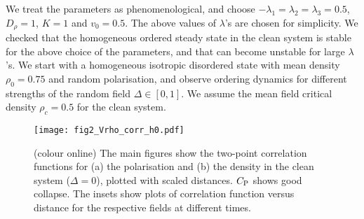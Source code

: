 \documentclass[pre,twocolumn,amssymb,showpacs,superscriptaddress,notitlepage]{revtex4-1}
\begin{document}
We treat the parameters as phenomenological, and choose $-\lambda_1 = \lambda_2 = \lambda_3=0.5$, $D_{\rho} = 1$, $K = 1$ and $v_0 = 0.5$.  The above values of $\lambda$'s 
are chosen for simplicity. We checked that the homogeneous ordered steady state in the clean system is stable \cite{shradhapre} 
for the above choice of the parameters,  and that can become unstable for large $\lambda$'s. We start with a homogeneous 
isotropic disordered state with mean density $\rho_0 = 0.75$ and random  polarisation, and observe ordering dynamics 
for different strengths of the random field $\Delta \in [0,1]$. We assume the mean field critical density $\rho_c = 0.5$ for the 
clean system.


\begin{figure}[b]
  \begin{center}
  \texttt{[image: fig2\_Vrho\_corr\_h0.pdf]}
\caption{(colour online)
The main figures show the two-point correlation functions for (a) the  polarisation and 
(b) the density in the clean system
($\Delta=0$), plotted with scaled distances. $C_{\rm  P}$ shows good collapse. The insets show  plots of correlation function 
versus distance for the respective fields at different times.}
\label{fig2}
\end{center}
\end{figure}

\end{document}

